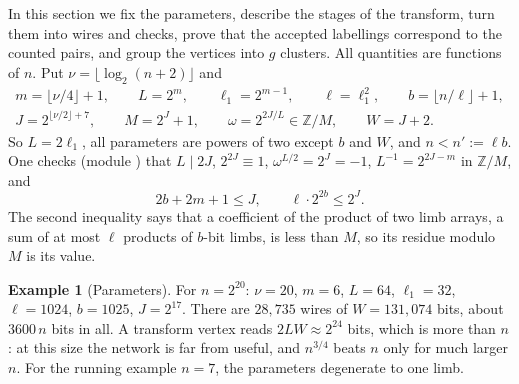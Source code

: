 \documentclass[10pt]{amsart}
\theoremstyle{plain}
\theoremstyle{definition}
\newtheorem{example}[theorem]{Example}
\theoremstyle{remark}
\numberwithin{equation}{section}
\newcommand{\Z}{\mathbb{Z}}
\begin{document}
In this section we fix the parameters, describe the stages of the transform, turn them into wires and
checks, prove that the accepted labellings correspond to the counted pairs, and group the vertices into
$g$ clusters. All quantities are functions of $n$. Put $\nu=\lfloor\log_2(n+2)\rfloor$ and
\begin{gather*}
  m=\lfloor\nu/4\rfloor+1,\qquad L=2^m,\qquad \ell_1=2^{m-1},\qquad \ell=\ell_1^2,\qquad
  b=\lfloor n/\ell\rfloor+1,\\
  J=2^{\lfloor\nu/2\rfloor+7},\qquad M=2^J+1,\qquad \omega=2^{2J/L}\in\Z/M,\qquad W=J+2 .
\end{gather*}
So $L=2\ell_1$, all parameters are powers of two except $b$ and $W$, and $n<n':=\ell b$. One checks
(module ) that $L\mid2J$, $2^{2J}\equiv1$, $\omega^{L/2}=2^J=-1$, $L^{-1}=2^{2J-m}$ in $\Z/M$,
and
\begin{equation}\label{eq:noWrap}
  2b+2m+1\le J,\qquad \ell\cdot2^{2b}\le 2^J .
\end{equation}
The second inequality says that a coefficient of the product of two limb arrays, a sum of at most
$\ell$ products of $b$-bit limbs, is less than $M$, so its residue modulo $M$ is its value.

\begin{example}[Parameters]\label{ex:params}
For $n=2^{20}$: $\nu=20$, $m=6$, $L=64$, $\ell_1=32$, $\ell=1024$, $b=1025$, $J=2^{17}$. There are
$28{,}735$ wires of $W=131{,}074$ bits, about $3600\,n$ bits in all. A transform vertex reads $2LW\approx2^{24}$
bits, which is more than $n$: at this size the network is far from useful, and $n^{3/4}$ beats $n$
only for much larger $n$. For the running example $n=7$, the parameters degenerate to one limb.
\end{example}
\end{document}
